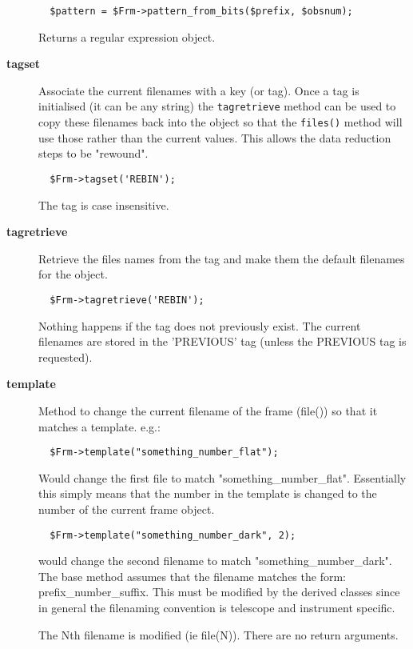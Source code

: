 \begin{description}
\begin{verbatim}
  $pattern = $Frm->pattern_from_bits($prefix, $obsnum);
\end{verbatim}


Returns a regular expression object.


\item[\textbf{tagset}] \mbox{}

Associate the current filenames with a key (or tag). Once a tag
is initialised (it can be any string) the \texttt{tagretrieve} method
can be used to copy these filenames back into the object so that
the \texttt{files()} method will use those rather than the current
values. This allows the data reduction steps to be "rewound".

\begin{verbatim}
  $Frm->tagset('REBIN');
\end{verbatim}


The tag is case insensitive.


\item[\textbf{tagretrieve}] \mbox{}

Retrieve the files names from the tag and make them the default
filenames for the object.

\begin{verbatim}
  $Frm->tagretrieve('REBIN');
\end{verbatim}


Nothing happens if the tag does not previously exist.
The current filenames are stored in the 'PREVIOUS' tag (unless the
PREVIOUS tag is requested).


\item[\textbf{template}] \mbox{}

Method to change the current filename of the frame (file())
so that it matches a template. e.g.:

\begin{verbatim}
  $Frm->template("something_number_flat");
\end{verbatim}


Would change the first file to match "something\_number\_flat".
Essentially this simply means that the number in the template
is changed to the number of the current frame object.

\begin{verbatim}
  $Frm->template("something_number_dark", 2);
\end{verbatim}


would change the second filename to match "something\_number\_dark".
The base method assumes that the filename matches the form:
prefix\_number\_suffix. This must be modified by the derived
classes since in general the filenaming convention is telescope
and instrument specific.



The Nth filename is modified (ie file(N)).
There are no return arguments.

\end{description}
